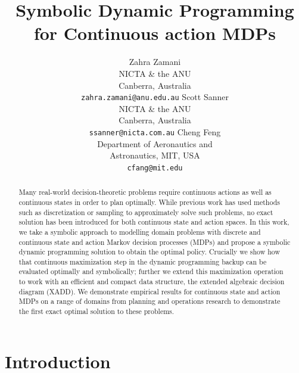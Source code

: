 \documentclass[letterpaper]{article}
\renewcommand{\-}{\text{-}}
\begin{document}
%
\title{Symbolic Dynamic Programming for Continuous action MDPs}

\author{Zahra Zamani\\
NICTA \& the ANU\\
Canberra, Australia\\
{\tt zahra.zamani@anu.edu.au}
\And
Scott Sanner\\
NICTA \& the ANU\\
Canberra, Australia\\
{\tt ssanner@nicta.com.au}
\And
Cheng Feng\\
Department of Aeronautics and\\
Astronautics, MIT, USA\\
{\tt cfang@mit.edu}
}
\maketitle

\begin{abstract}
Many real-world decision-theoretic problems require continuous actions as well as continuous 
states in order to plan optimally. While previous work has used methods such as discretization or 
sampling to approximately solve such problems, no exact solution has been introduced for both 
continuous state and action spaces. In this work, we take a symbolic approach to modelling domain 
problems with discrete and continuous state and action Markov decision processes (MDPs) and 
propose a symbolic dynamic programming solution to obtain the optimal policy. Crucially we show 
how that continuous maximization step in the dynamic programming backup can be evaluated 
optimally and symbolically; further we extend this maximization operation to work with an 
efficient and compact data structure, the extended algebraic decision diagram (XADD). We 
demonstrate empirical results for continuous state and action MDPs on a range of domains from 
planning and operations research to demonstrate the first exact optimal solution to these 
problems.
\end{abstract}


\section{Introduction}

\label{sec:intro}
\end{document}
